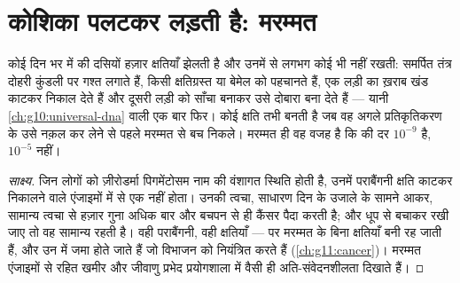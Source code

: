 \section{कोशिका पलटकर लड़ती है: मरम्मत}

\begin{proposition}\label{prop:g11:mutations:repair}
कोई  दिन भर में  की दसियों हज़ार क्षतियाँ झेलती है और उनमें से
लगभग कोई भी नहीं रखती: समर्पित  तंत्र दोहरी कुंडली पर गश्त लगाते
हैं, किसी क्षतिग्रस्त या बेमेल  को पहचानते हैं, एक लड़ी का ख़राब
खंड काटकर निकाल देते हैं और दूसरी लड़ी को साँचा बनाकर उसे दोबारा बना देते
हैं --- यानी \cref{ch:g10:universal-dna} वाली  एक बार फिर। कोई
क्षति  तभी बनती है जब वह अगले प्रतिकृतिकरण के उसे नक़ल कर लेने
से पहले मरम्मत से बच निकले। मरम्मत ही वह वजह है कि  की दर
$10^{-9}$ है, $10^{-5}$ नहीं।
\end{proposition}
\begin{proof}[साक्ष्य]
जिन लोगों को ज़ीरोडर्मा पिगमेंटोसम नाम की वंशागत स्थिति होती है, उनमें
पराबैंगनी क्षति काटकर निकालने वाले एंजाइमों में से एक नहीं होता। उनकी
त्वचा, साधारण दिन के उजाले के सामने आकर, सामान्य त्वचा से हज़ार गुना अधिक
बार और बचपन से ही कैंसर पैदा करती है; और धूप से बचाकर रखी जाए तो वह
सामान्य रहती है। वही पराबैंगनी, वही क्षतियाँ --- पर मरम्मत के बिना
क्षतियाँ बनी रह जाती हैं, और  उन  में जमा होते जाते हैं जो
 विभाजन को नियंत्रित करते हैं (\cref{ch:g11:cancer})। मरम्मत
एंजाइमों से रहित खमीर और जीवाणु प्रभेद प्रयोगशाला में वैसी ही
अति-संवेदनशीलता दिखाते हैं।
\end{proof}

